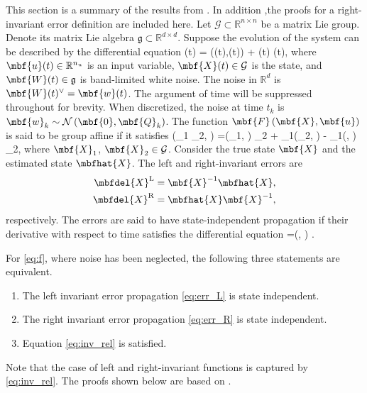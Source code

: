 This section is a summary of the results from \cite{Barrau2017}. In addition ,the proofs for a right-invariant error definition are included here. Let $\mathcal{G} \subset \mathbb{R}^{n \times n}$ be a matrix Lie group. Denote its matrix Lie algebra $\mathfrak{g} \subset \mathbb{R}^{d \times d}$. Suppose the evolution of the system can be described by the differential equation
\beq
	(t) = ((t),(t)) + (t) (t), \label{eq:f}
\eeq
where $\mbf{u}(t) \in \mathbb{R}^{n_u}$ is an input variable, $\mbf{X}(t) \in \mathcal{G}$ is the state, and $\mbf{W}(t) \in \mathfrak{g}$ is band-limited white noise. The noise in $\mathbb{R}^d$ is $\mbf{W}(t)^{\vee} = \mbf{w}(t)$. The argument of time will be suppressed throughout for brevity. When discretized, the noise at time $t_k$ is $\mbf{w}_k \sim \mathcal{N} \left(\mbf{0},\mbf{Q}_k\right)$.  The function $\mbf{F}\left(\mbf{X},\mbf{u}\right)$ is said to be group affine if it satisfies
\beq
	\left(_1 _2, \right) =\left(_1, \right) _2 + _1\left(_2, \right) - _1\left(, \right) _2, \label{eq:inv_rel} 
\eeq
where $\mbf{X}_1$, $\mbf{X}_2 \in \mathcal{G}$. Consider the true state $\mbf{X}$ and the estimated state $\mbfhat{X}$. The left and right-invariant errors are
\begin{align}
	\mbfdel{X}^\mathrm{L} & = \mbf{X}^{-1} \mbfhat{X}, \label{eq:err_L} \\
	\mbfdel{X}^\mathrm{R} & = \mbfhat{X} \mbf{X}^{-1}, \label{eq:err_R}
\end{align}
respectively. The errors are said to have state-independent propagation if their derivative with respect to time satisfies the differential equation
\beq
	\delta {} =\left(, \right) \label{eq:traj_ind}.
\eeq
\begin{theorem}
	\label{thm:inv_c}
	For \eqref{eq:f}, where noise has been neglected, the following three statements are equivalent.
	\begin{enumerate}
		\item The left invariant error propagation \eqref{eq:err_L} is state independent.
		\item The right invariant error propagation \eqref{eq:err_R} is state independent.
		\item Equation \eqref{eq:inv_rel} is satisfied.
	\end{enumerate}
\end{theorem}
Note that the case of left and right-invariant functions is captured by \eqref{eq:inv_rel}. The proofs shown below are based on \cite{Barrau2017,Barrau2015}.
